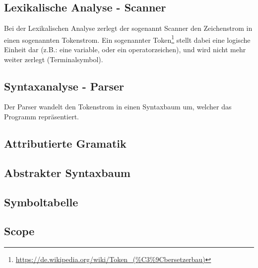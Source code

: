 
\subsection{Lexikalische Analyse - Scanner}

Bei der Lexikalischen Analyse zerlegt der sogenannt Scanner den Zeichenstrom in einen sogenannten Tokenstrom. Ein sogenannter Token\footnote{\url{https://de.wikipedia.org/wiki/Token_(\%C3\%9Cbersetzerbau)}} stellt dabei eine logische Einheit dar (z.B.: eine variable, oder ein operatorzeichen), und wird nicht mehr weiter zerlegt (Terminalsymbol).

\subsection{Syntaxanalyse - Parser}

Der Parser wandelt den Tokenstrom in einen Syntaxbaum um, welcher das Programm repräsentiert.

\subsection{Attributierte Gramatik}

\subsection{Abstrakter Syntaxbaum}

\subsection{Symboltabelle}

\subsection{Scope}